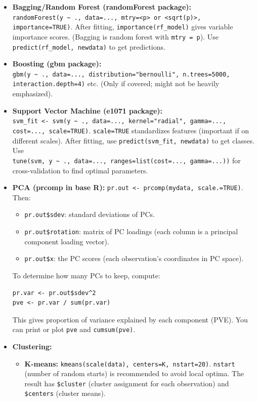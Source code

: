 \documentclass[11pt]{article}
\begin{document}
\begin{itemize}
    \item \textbf{Bagging/Random Forest (randomForest package):} \\ \verb|randomForest(y ~ ., data=..., mtry=<p> or <sqrt(p)>, importance=TRUE)|. After fitting, \verb|importance(rf_model)| gives variable importance scores. (Bagging is random forest with \texttt{mtry = p}). Use \verb|predict(rf_model, newdata)| to get predictions.
    
    \item \textbf{Boosting (gbm package):} \\ \verb|gbm(y ~ ., data=..., distribution="bernoulli", n.trees=5000, interaction.depth=4)| etc. (Only if covered; might not be heavily emphasized).
    
    \item \textbf{Support Vector Machine (e1071 package):} \\ \verb|svm_fit <- svm(y ~ ., data=..., kernel="radial", gamma=..., cost=..., scale=TRUE)|. \texttt{scale=TRUE} standardizes features (important if on different scales). After fitting, use \verb|predict(svm_fit, newdata)| to get classes. Use \\ \verb|tune(svm, y ~ ., data=..., ranges=list(cost=..., gamma=...))| for cross-validation to find optimal parameters.
    
    \item \textbf{PCA (prcomp in base R):} \verb|pr.out <- prcomp(mydata, scale.=TRUE)|. Then:
    \begin{itemize}
        \item \texttt{pr.out\$sdev}: standard deviations of PCs.
        \item \texttt{pr.out\$rotation}: matrix of PC loadings (each column is a principal component loading vector).
        \item \texttt{pr.out\$x}: the PC scores (each observation's coordinates in PC space).
    \end{itemize}
    To determine how many PCs to keep, compute:
    \begin{verbatim}
pr.var <- pr.out$sdev^2
pve <- pr.var / sum(pr.var)
    \end{verbatim}
    This gives proportion of variance explained by each component (PVE). You can print or plot \texttt{pve} and \texttt{cumsum(pve)}.
    
    \item \textbf{Clustering:}
    \begin{itemize}
        \item \textbf{K-means:} \verb|kmeans(scale(data), centers=K, nstart=20)|. \texttt{nstart} (number of random starts) is recommended to avoid local optima. The result has \texttt{\$cluster} (cluster assignment for each observation) and \texttt{\$centers} (cluster means).
        

\end{itemize}
\end{itemize}
\end{document}
